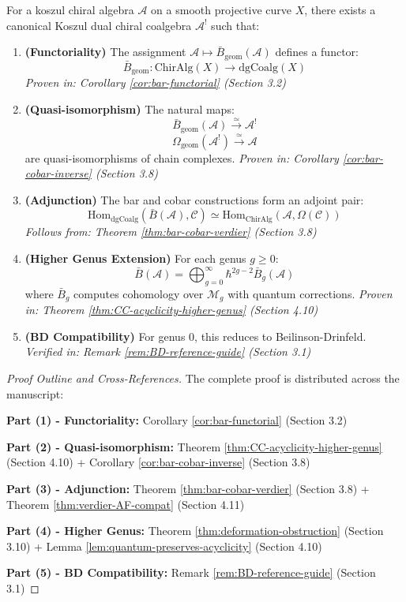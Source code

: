 \begin{maintheorem}\label{mainthm:bar-cobar-complete}
For a koszul chiral algebra $\mathcal{A}$ on a smooth projective curve $X$, there exists a 
canonical Koszul dual chiral coalgebra $\mathcal{A}^!$ such that:

\begin{enumerate}
\item \textbf{(Functoriality)} The assignment $\mathcal{A} \mapsto \bar{B}_{\text{geom}}(\mathcal{A})$ 
defines a functor:
$$\bar{B}_{\text{geom}}: \text{ChirAlg}(X) \to \text{dgCoalg}(X)$$
\textit{Proven in: Corollary \ref{cor:bar-functorial} (Section 3.2)}

\item \textbf{(Quasi-isomorphism)} The natural maps:
$$\bar{B}_{\text{geom}}(\mathcal{A}) \xrightarrow{\simeq} \mathcal{A}^!$$
$$\Omega_{\text{geom}}(\mathcal{A}^!) \xrightarrow{\simeq} \mathcal{A}$$
are quasi-isomorphisms of chain complexes.
\textit{Proven in: Corollary \ref{cor:bar-cobar-inverse} (Section 3.8)}

\item \textbf{(Adjunction)} The bar and cobar constructions form an adjoint pair:
$$\text{Hom}_{\text{dgCoalg}}(\bar{B}(\mathcal{A}), \mathcal{C}) 
\simeq \text{Hom}_{\text{ChirAlg}}(\mathcal{A}, \Omega(\mathcal{C}))$$
\textit{Follows from: Theorem \ref{thm:bar-cobar-verdier} (Section 3.8)}

\item \textbf{(Higher Genus Extension)} For each genus $g \geq 0$:
$$\bar{B}(\mathcal{A}) = \bigoplus_{g=0}^{\infty} \hbar^{2g-2} \bar{B}_g(\mathcal{A})$$
where $\bar{B}_g$ computes cohomology over $\mathcal{M}_g$ with quantum corrections.
\textit{Proven in: Theorem \ref{thm:CC-acyclicity-higher-genus} (Section 4.10)}

\item \textbf{(BD Compatibility)} For genus 0, this reduces to Beilinson-Drinfeld.
\textit{Verified in: Remark \ref{rem:BD-reference-guide} (Section 3.1)}
\end{enumerate}
\end{maintheorem}

\begin{proof}[Proof Outline and Cross-References]
The complete proof is distributed across the manuscript:

\textbf{Part (1) - Functoriality:}
Corollary \ref{cor:bar-functorial} (Section 3.2)

\textbf{Part (2) - Quasi-isomorphism:}
Theorem \ref{thm:CC-acyclicity-higher-genus} (Section 4.10) + Corollary \ref{cor:bar-cobar-inverse} (Section 3.8)

\textbf{Part (3) - Adjunction:}
Theorem \ref{thm:bar-cobar-verdier} (Section 3.8) + Theorem \ref{thm:verdier-AF-compat} (Section 4.11)

\textbf{Part (4) - Higher Genus:}
Theorem \ref{thm:deformation-obstruction} (Section 3.10) + Lemma \ref{lem:quantum-preserves-acyclicity} (Section 4.10)

\textbf{Part (5) - BD Compatibility:}
Remark \ref{rem:BD-reference-guide} (Section 3.1)
\end{proof}


